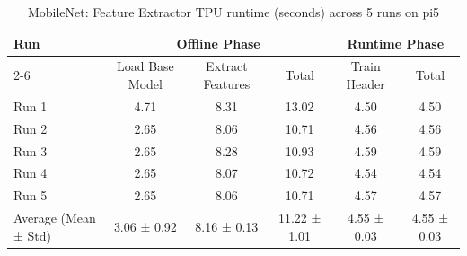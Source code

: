 \begin{table}[t]
\centering
\caption{MobileNet: Feature Extractor TPU runtime (seconds) across 5 runs on pi5}
\label{tab:runtime_mobilenet_EdgeTPU_pi5}
\begin{tabular}{lccccc}
\hline
\multirow{2}{*}{Run} & \multicolumn{3}{c}{Offline Phase} & \multicolumn{2}{c}{Runtime Phase} \\
\cline{2-6}
 & Load Base Model & Extract Features & Total & Train Header & Total \\
\hline
  Run 1                  & 4.71           & 8.31           & 13.02          & 4.50           & 4.50           \\
  Run 2                  & 2.65           & 8.06           & 10.71          & 4.56           & 4.56           \\
  Run 3                  & 2.65           & 8.28           & 10.93          & 4.59           & 4.59           \\
  Run 4                  & 2.65           & 8.07           & 10.72          & 4.54           & 4.54           \\
  Run 5                  & 2.65           & 8.06           & 10.71          & 4.57           & 4.57           \\
\hline
  Average (Mean ± Std)   & 3.06 ± 0.92    & 8.16 ± 0.13    & 11.22 ± 1.01   & 4.55 ± 0.03    & 4.55 ± 0.03    \\
\hline
\end{tabular}
\end{table}
